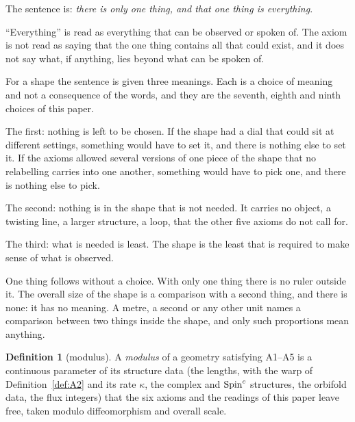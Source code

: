 \documentclass[11pt,a4paper]{article}
\theoremstyle{plain}
\theoremstyle{definition}
\newtheorem{definition}[theorem]{Definition}
\theoremstyle{remark}
\begin{document}
The sentence is: \emph{there is only one thing, and that one thing is everything}.

``Everything'' is read as everything that can be observed or spoken of. The axiom is not read as saying that the one thing contains all that could exist, and it does not say what, if anything, lies beyond what can be spoken of.

For a shape the sentence is given three meanings. Each is a choice of meaning and not a consequence of the words, and they are the seventh, eighth and ninth choices of this paper.

The first: nothing is left to be chosen. If the shape had a dial that could sit at different settings, something would have to set it, and there is nothing else to set it. If the axioms allowed several versions of one piece of the shape that no relabelling carries into one another, something would have to pick one, and there is nothing else to pick.

The second: nothing is in the shape that is not needed. It carries no object, a twisting line, a larger structure, a loop, that the other five axioms do not call for.

The third: what is needed is least. The shape is the least that is required to make sense of what is observed.

One thing follows without a choice. With only one thing there is no ruler outside it. The overall size of the shape is a comparison with a second thing, and there is none: it has no meaning. A metre, a second or any other unit names a comparison between two things inside the shape, and only such proportions mean anything.

\begin{definition}[modulus]\label{def:modulus}
A \emph{modulus} of a geometry satisfying A1--A5 is a continuous parameter of its structure data (the lengths, with the warp of Definition~\ref{def:A2} and its rate $\kappa$, the complex and $\text{Spin}^c$ structures, the orbifold data, the flux integers) that the six axioms and the readings of this paper leave free, taken modulo diffeomorphism and overall scale.
\end{definition}
\end{document}

